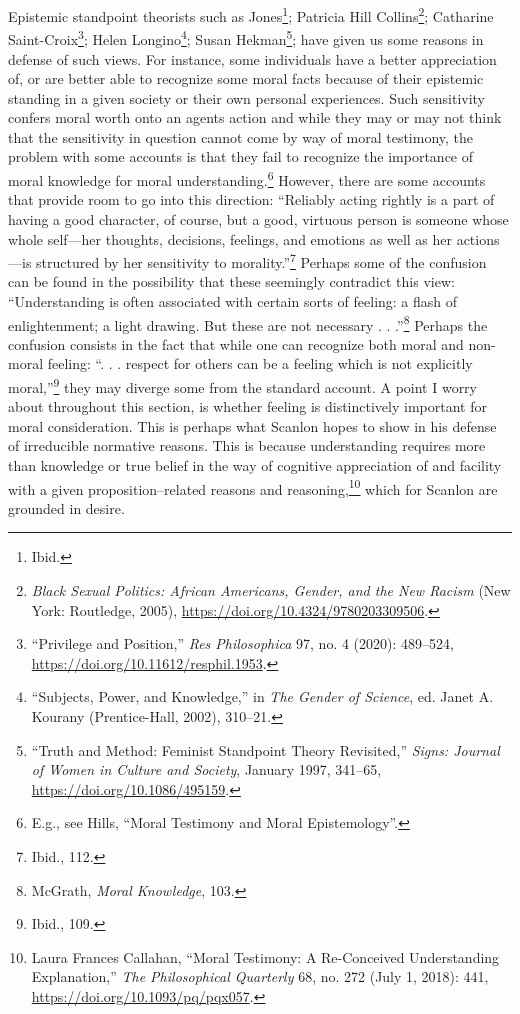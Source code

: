 \documentclass[
  12pt,
]{book}
\theoremstyle{definition}
\theoremstyle{definition}
\theoremstyle{definition}
\theoremstyle{definition}
\theoremstyle{remark}
\begin{document}
Epistemic standpoint theorists such as Jones\footnote{Ibid.}; Patricia Hill Collins\footnote{\emph{Black {Sexual Politics}: {African Americans}, {Gender}, and the {New Racism}} (New York: Routledge, 2005), \url{https://doi.org/10.4324/9780203309506}.}; Catharine Saint-Croix\footnote{{``Privilege and {Position},''} \emph{Res Philosophica} 97, no. 4 (2020): 489--524, \url{https://doi.org/10.11612/resphil.1953}.}; Helen Longino\footnote{{``Subjects, {Power}, and {Knowledge},''} in \emph{The {Gender} of {Science}}, ed. Janet A. Kourany (Prentice-Hall, 2002), 310--21.}; Susan Hekman\footnote{{``Truth and Method: {Feminist} Standpoint Theory Revisited,''} \emph{Signs: Journal of Women in Culture and Society}, January 1997, 341--65, \url{https://doi.org/10.1086/495159}.}; have given us some reasons in defense of such views. For instance, some individuals have a better appreciation of, or are better able to recognize some moral facts because of their epistemic standing in a given society or their own personal experiences. Such sensitivity confers moral worth onto an agent\textquotesingle s action and while they may or may not think that the sensitivity in question cannot come by way of moral testimony, the problem with some accounts is that they fail to recognize the importance of moral knowledge for moral understanding.\footnote{E.g., see Hills, {``Moral Testimony and Moral Epistemology''}.} However, there are some accounts that provide room to go into this direction: ``Reliably acting rightly is a part of having a good character, of course, but a good, virtuous person is someone whose whole self---her thoughts, decisions, feelings, and emotions as well as her actions---is structured by her sensitivity to morality.''\footnote{Ibid., 112.} Perhaps some of the confusion can be found in the possibility that these seemingly contradict this view: ``Understanding is often associated with certain sorts of feeling: a flash of enlightenment; a light drawing. But these are not necessary . . .''\footnote{McGrath, \emph{Moral {Knowledge}}, 103.} Perhaps the confusion consists in the fact that while one can recognize both moral and non-moral feeling: ``. . . respect for others can be a feeling which is not explicitly moral,''\footnote{Ibid., 109.} they may diverge some from the standard account. A point I worry about throughout this section, is whether feeling is distinctively important for moral consideration. This is perhaps what Scanlon hopes to show in his defense of irreducible normative reasons. This is because understanding requires more than knowledge or true belief in the way of cognitive appreciation of and facility with a given proposition--related reasons and reasoning,\footnote{Laura Frances Callahan, {``Moral {Testimony}: {A Re-Conceived Understanding Explanation},''} \emph{The Philosophical Quarterly} 68, no. 272 (July 1, 2018): 441, \url{https://doi.org/10.1093/pq/pqx057}.} which for Scanlon are grounded in desire.
\end{document}
